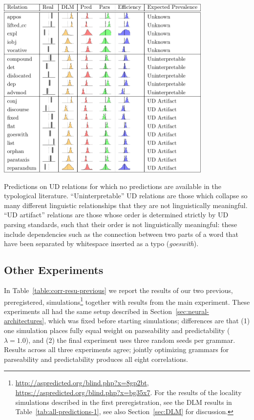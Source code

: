 \documentclass[10pt,twoside,lineno]{article}
\begin{document}
\begin{table} %
	\begin{center}	
\includegraphics[width=0.8\textwidth]{si-table-perrel-2-1.png}  
\end{center}
\caption{Predictions on UD relations for which no predictions are available in the typological literature.  ``Uninterpretable'' UD relations are those which collapse so many different linguistic relationships that they are not linguistically meaningful. ``UD artifact'' relations are those whose order is determined strictly by UD parsing standards, such that their order is not linguistically meaningful: these include dependencies such as the connection between two parts of a word that have been separated by whitespace inserted as a typo (\emph{goeswith}).}
\label{tab:all-predictions-2}
\end{table}









\subsection{Other Experiments}
In Table~\ref{table:corr-resu-previous} we report the results of our two previous, preregistered, simulations\footnote{\url{http://aspredicted.org/blind.php?x=8gp2bt}, \url{https://aspredicted.org/blind.php?x=bg35x7}. For the results of the locality simulations described in the first preregistration, see the DLM results in Table~\ref{tab:all-predictions-1}, see also Section~\ref{sec:DLM} for discussion.} together with results from the main experiment.
These experiments all had the same setup described in Section~\ref{sec:neural-architectures}, which was fixed before starting simulations; differences are that (1) one simulation places fully equal weight on parseability and predictability ($\lambda=1.0$), and (2) the final experiment uses three random seeds per grammar.
Results across all three experiments agree; jointly optimizing grammars for parseability and predictability produces all eight correlations.
\end{document}

